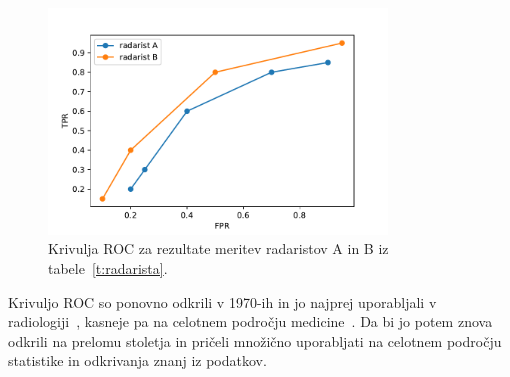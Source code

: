 \begin{table}[btp]
  \caption{Rezultati meritev uspešnosti dveh radaristov, kjer so uspešnost pri prvem (leva tabela) merili pri petih različnih pogojih in pri drugem (tabela na desni) pri štirih različnih pogojih.}
  \label{t:radarista}
\end{table}

\begin{figure}[htbp]
\begin{center}
\includegraphics[width=9cm]{slike/radarista.pdf}
\caption{Krivulja ROC za rezultate meritev radaristov A in B iz tabele~\ref{t:radarista}.}
\label{f:radarista}
\end{center}
\end{figure}

Krivuljo ROC so ponovno odkrili v 1970-ih in jo najprej uporabljali v radiologiji~\cite{Hanley1982}, kasneje pa na celotnem področju medicine~\cite{Beck1986}. Da bi jo potem znova odkrili na prelomu stoletja in pričeli množično uporabljati na celotnem področju statistike in odkrivanja znanj iz podatkov.


